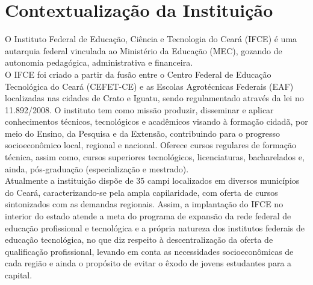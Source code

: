 \chapter{Contextualização da Instituição}
 
O Instituto Federal de Educação, Ciência e Tecnologia do Ceará (IFCE) é uma autarquia federal vinculada ao Ministério da Educação (MEC), gozando de autonomia pedagógica, administrativa e financeira.\\

O IFCE foi criado a partir da fusão entre o Centro Federal de Educação Tecnológica do Ceará (CEFET-CE) e as Escolas Agrotécnicas Federais (EAF) localizadas nas cidades de Crato e Iguatu, sendo regulamentado através da lei no 11.892/2008. O instituto tem como missão produzir, disseminar e aplicar conhecimentos técnicos, tecnológicos e acadêmicos visando à formação cidadã, por meio do Ensino, da Pesquisa e da Extensão, contribuindo para o progresso socioeconômico local, regional e nacional. Oferece cursos regulares de formação técnica, assim como, cursos superiores tecnológicos, licenciaturas, bacharelados e, ainda, pós-graduação (especialização e mestrado).\\

Atualmente a instituição dispõe de 35 campi localizados em diversos municípios do Ceará, caracterizando-se pela ampla capilaridade, com oferta de cursos sintonizados com as demandas regionais. Assim, a implantação do IFCE no interior do estado atende a meta do programa de expansão da rede federal de educação profissional e tecnológica e a própria natureza dos institutos federais de educação tecnológica, no que diz respeito à descentralização da oferta de qualificação profissional, levando em conta as necessidades socioeconômicas de cada região e ainda o propósito de evitar o êxodo de jovens estudantes para a capital.\\

